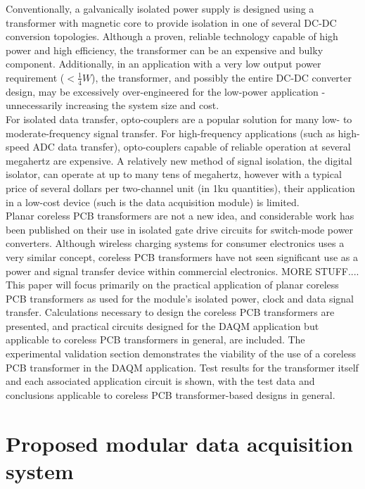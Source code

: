 \documentclass[conference]{IEEEtran}
\begin{document}
Conventionally, a galvanically isolated power supply is designed using a transformer with magnetic core to provide isolation in one of several DC-DC conversion topologies.  Although a proven, reliable technology capable of high power and high efficiency, the transformer can be an expensive and bulky component.  Additionally, in an application with a very low output power requirement ($<\frac{1}{4}W$), the transformer, and possibly the entire DC-DC converter design, may be excessively over-engineered for the low-power application - unnecessarily increasing the system size and cost.
\\
For isolated data transfer, opto-couplers are a popular solution for many low- to moderate-frequency signal transfer.  For high-frequency applications (such as high-speed ADC data transfer), opto-couplers capable of reliable operation at several megahertz are expensive.  A relatively new method of signal isolation, the digital isolator, can operate at up to many tens of megahertz, however with a typical price of several dollars per two-channel unit (in 1ku quantities), their application in a low-cost device (such is the data acquisition module) is limited.
\\
Planar coreless PCB transformers are not a new idea, and considerable work has been published on their use in isolated gate drive circuits for switch-mode power converters.  Although wireless charging systems for consumer electronics uses a very similar concept, coreless PCB transformers have not seen significant use as a power and signal transfer device within commercial electronics.  MORE STUFF....
\\
This paper will focus primarily on the practical application of planar coreless PCB transformers as used for the module's isolated power, clock and data signal transfer.  Calculations necessary to design the coreless PCB transformers are presented, and practical circuits designed for the DAQM application but applicable to coreless PCB transformers in general, are included.  The experimental validation section demonstrates the viability of the use of a coreless PCB transformer in the DAQM application.  Test results for the transformer itself and each associated application circuit is shown, with the test data and conclusions applicable to coreless PCB transformer-based designs in general.

\section{Proposed modular data acquisition system}
\end{document}
